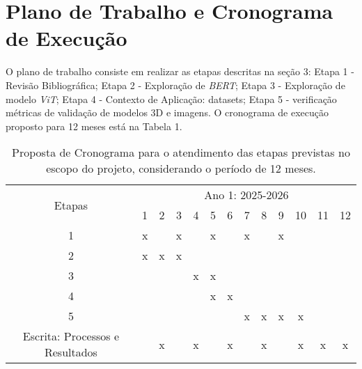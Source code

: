 \section{Plano de Trabalho e Cronograma de Execução}


O plano de trabalho consiste em realizar as etapas descritas na seção 3: Etapa 1 - Revisão Bibliográfica; Etapa 2 - Exploração de \textit{BERT}; Etapa 3 - Exploração de modelo \textit{ViT}; Etapa 4 - Contexto de Aplicação: datasets; Etapa 5 - verificação métricas de validação de modelos 3D e imagens. O cronograma de execução proposto para 12 meses está na Tabela 1. 

\begin{table}[h]

\caption{Proposta de Cronograma para o atendimento das etapas previstas no escopo do projeto, considerando o período de 12 meses.}

\label{tab:cronograma}
	\centering
		\begin{tabular} {|c|c|c|c|c|c|c|c|c|c|c|c|c|}
		\hline
		\multirow{2}{*}{Etapas}
		&\multicolumn{12}{c|}{Ano 1: 2025-2026}\\ \cline{2-13}
		&1&2&3&4&5&6&7&8&9&10&11&12\\
		\hline
		1&x&&x&&x&&x&&x&&&\\
		\hline
		2&x&x&x&&&&&&&&&\\
		\hline	
		3&&&&x&x&&&&&&&\\
		\hline			
		4&&&&&x&x&&&&&&\\
		\hline	
		5&&&&&&&x&x&x&x&&\\
		\hline	
		

		Escrita: Processos e Resultados&&x&&x&&x&&x&&x&x&x\\
		\hline
		\end{tabular}
\end{table}
